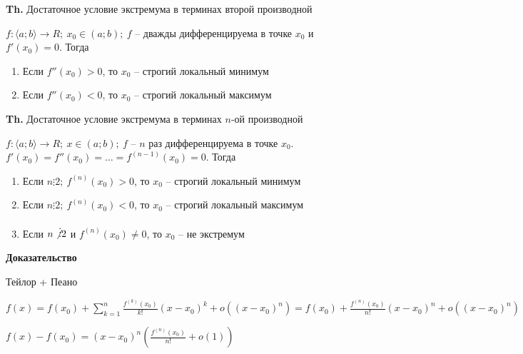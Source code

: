 \documentclass[14pt, letter paper]{article}
\newcommand{\q}[1]{\langle #1 \rangle}
\begin{document}
\vspace{5mm}

\textbf{Th.} Достаточное условие экстремума в терминах второй производной

$f : \q{a; b} \rightarrow R;\ x_0 \in (a; b);\ f$ -- дважды дифференцируема в точке $x_0$ и $f'(x_0) = 0$. Тогда

\begin{enumerate}
    \item Если $f''(x_0) > 0$, то $x_0$ -- строгий локальный минимум
    \item Если $f''(x_0) < 0$, то $x_0$ -- строгий локальный максимум
\end{enumerate}

\textbf{Th.} Достаточное условие экстремума в терминах $n$-ой производной

$f : \q{a; b} \rightarrow R;\ x \in (a; b);\ f$ -- $n$ раз дифференцируема в точке $x_0$. $f'(x_0) = f''(x_0) = \ldots = f^{(n - 1)}(x_0) = 0$. Тогда

\begin{enumerate}
    \item Если $n \vdots 2;\ f^{(n)}(x_0) > 0$, то $x_0$ -- строгий локальный минимум
    \item Если $n \vdots 2;\ f^{(n)}(x_0) < 0$, то $x_0$ -- строгий локальный максимум
    \item Если $n \not \vdots 2$ и $f^{(n)}(x_0) \neq 0$, то $x_0$ -- не экстремум
\end{enumerate}

\begin{center}
    \textbf{Доказательство}
\end{center}

Тейлор + Пеано

$f(x) = f(x_0) + \sum\limits_{k = 1}^n \frac{f^{(k)}(x_0)}{k!}(x - x_0)^k + o((x - x_0)^n) = f(x_0) + \frac{f^{(n)}(x_0)}{n!}(x - x_0)^n + o((x - x_0)^n)$

$f(x) - f(x_0) = (x - x_0)^n (\frac{f^{(n)}(x_0)}{n!} + o(1))$
\end{document}
